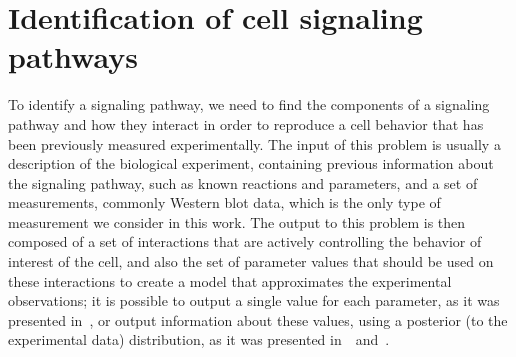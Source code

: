\section{Identification of cell signaling pathways}
To identify a signaling pathway, we need to find the components of a
signaling pathway and how they interact in order to reproduce a cell 
behavior that has been previously measured experimentally. The input of 
this problem is usually a description of the biological experiment,
containing previous information about the signaling pathway, such as
known reactions and parameters, and a set of measurements, commonly
Western blot data, which is the only type of measurement we consider in
this work. The output to this problem is then composed of a set of
interactions that are actively controlling the behavior of interest of
the cell, and also the set of parameter values that should be used on
these interactions to create a model that approximates the experimental
observations; it is possible to output a single value for each
parameter, as it was presented in~\cite{Wu15}, or output information
about these values, using a posterior (to the experimental data)
distribution, as it was presented in~\cite{Liepe2014}~and~\cite{Xura20}.

